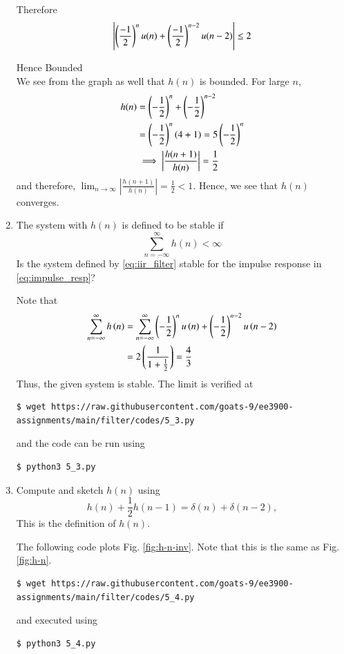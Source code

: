 \documentclass[journal,12pt,twocolumn]{IEEEtran}
\renewcommand\thesection{\arabic{section}}
\begin{document}
\begin{enumerate}[label=\thesection.\arabic*]
Therefore
\begin{equation}
    \left\vert\left( \frac{-1}{2}\right)^n u(n) + \left( \frac{-1}{2}\right)^{n-2} u(n-2)\right\vert \leq 2
\end{equation}

Hence Bounded
\\
We see from the graph as well that $h(n)$ is bounded. For large $n$,
\begin{align}
	h(n) &= \left(-\frac{1}{2}\right)^n + \left(-\frac{1}{2}\right)^{n - 2} \\
		 &= \left(-\frac{1}{2}\right)^{n}\left(4 + 1\right) = 5\left(-\frac{1}{2}\right)^n \\
		 &\implies \left|\frac{h(n + 1)}{h(n)}\right| = \frac{1}{2}
\end{align}
and therefore, $\lim_{n \to \infty}\left|\frac{h(n + 1)}{h(n)}\right| = \frac{1}{2} < 1$. Hence, we see that $h(n)$ converges.  
\item The system with $h(n)$ is defined to be stable if
\begin{equation}
\sum_{n=-\infty}^{\infty}h(n) < \infty
\end{equation}
Is the system defined by \eqref{eq:iir_filter} stable for the impulse response in \eqref{eq:impulse_resp}?

\solution
Note that
\begin{align}
	\sum_{n = -\infty}^{\infty}h\left(n\right) &= \sum_{n = -\infty}^{\infty}
	\left(-\frac{1}{2}\right)^nu\left(n\right) + \left(-\frac{1}{2}\right)^{n - 2}u\left(n - 2\right) \\
										 &= 2\left(\frac{1}{1 + \frac{1}{2}}\right) = \frac{4}{3}
\end{align}
Thus, the given system is stable. The limit is verified at
\begin{lstlisting}
$ wget https://raw.githubusercontent.com/goats-9/ee3900-assignments/main/filter/codes/5_3.py
\end{lstlisting}
and the code can be run using
\begin{lstlisting}
$ python3 5_3.py
\end{lstlisting}

\item 
Compute and sketch $h(n)$ using 
\begin{equation}
\label{eq:iir_filter_h}
h(n) + \frac{1}{2}h(n-1) = \delta(n) + \delta(n-2), 
\end{equation}
This is the definition of $h(n)$.

\solution The following code plots Fig. \eqref{fig:h-n-inv}. Note that this is
the same as Fig. \eqref{fig:h-n}.
\begin{lstlisting}
$ wget https://raw.githubusercontent.com/goats-9/ee3900-assignments/main/filter/codes/5_4.py
\end{lstlisting}
and executed using
\begin{lstlisting}
$ python3 5_4.py
\end{lstlisting}


\end{enumerate}
\end{document}
